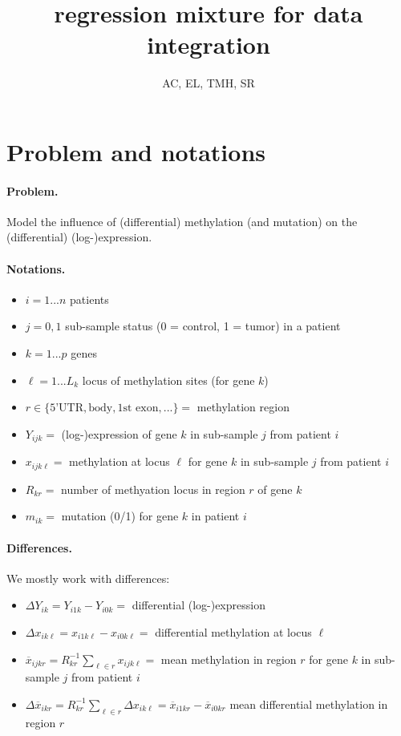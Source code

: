 \documentclass[a4paper, 11pt]{article}
\title{regression mixture for data integration}
\author{AC, EL, TMH, SR}
\newcommand{\Dx}{\Delta x}
\newcommand{\xb}{\overline{x}}
\newcommand{\Dxb}{\Delta \overline{x}}
\newcommand{\DY}{\Delta Y}
\begin{document}
\maketitle

\section{Problem and notations}

\paragraph{Problem.} Model the influence of (differential) methylation (and mutation) on the (differential) (log-)expression.

\paragraph{Notations.}
\begin{itemize}
 \item $i = 1 ... n$ patients
 \item $j = 0, 1$ sub-sample status (0 = control, 1 = tumor) in a patient
 \item $k = 1 ... p$ genes
 \item $\ell = 1 ... L_k$ locus of methylation sites (for gene $k$)
 \item $r \in \{\text{5'UTR}, \text{body}, \text{1st exon}, ...\} =$ methylation region 
 \item $Y_{ijk} =$ (log-)expression of gene $k$ in sub-sample $j$ from patient $i$
 \item $x_{ijk\ell} =$ methylation at locus $\ell$ for gene $k$ in sub-sample $j$ from patient $i$
 \item $R_{kr} =$ number of methyation locus in region $r$ of gene $k$
 \item $m_{ik} =$ mutation (0/1) for gene $k$ in patient $i$
\end{itemize}

\paragraph{Differences.} We mostly work with differences:
\begin{itemize}
 \item $\DY_{ik} = Y_{i1k} - Y_{i0k} =$ differential (log-)expression
 \item $\Dx_{ik\ell} = x_{i1k\ell} - x_{i0k\ell} =$ differential methylation at locus $\ell$
 \item $\xb_{ijkr} = R_{kr}^{-1} \sum_{\ell \in r} x_{ijk\ell}=$ mean methylation in region $r$ for gene $k$ in sub-sample $j$ from patient $i$
 \item $\Dxb_{ikr} = R_{kr}^{-1} \sum_{\ell \in r} \Dx_{ik\ell} = \xb_{i1kr} - \xb_{i0kr}$ mean differential methylation in region $r$
\end{itemize}
\end{document}
